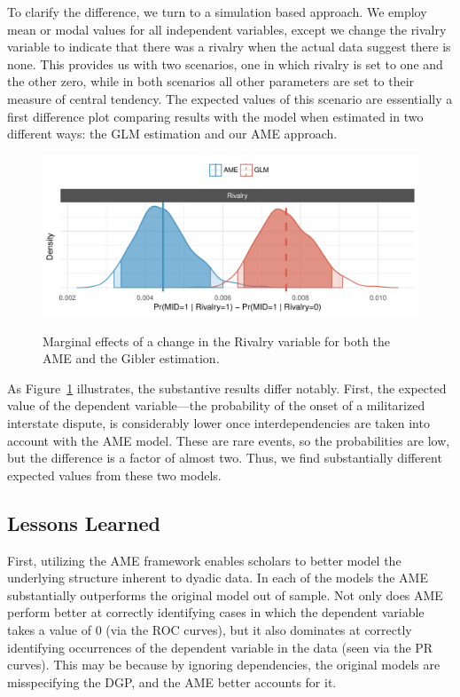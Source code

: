 To clarify the difference, we turn to a simulation based approach. We employ mean or modal values for all independent variables, except we change the rivalry variable to indicate that there was a rivalry when the actual data suggest there is none. This provides us with two scenarios, one in which rivalry is set to one and the other zero, while in both scenarios all other parameters are set to their measure of central tendency. The expected values of this scenario are essentially a first difference plot comparing results with the model when estimated in two different ways: the GLM estimation and our AME approach.

\begin{figure}
	\caption{Marginal effects of a change in the Rivalry variable for both the AME and the Gibler estimation.  \label{fig:gibmargeff}}
	\includegraphics[width=\textwidth]{graphics/gibler_margeff.pdf}
 	\label{fig:gibmargeff}
 \end{figure}

As Figure~\ref{fig:gibmargeff} illustrates, the substantive results differ notably. First, the expected value of the dependent variable---the probability of the onset of a militarized interstate dispute, is considerably lower once interdependencies are taken into account with the AME model.  These are rare events, so the probabilities are low, but the difference is a factor of almost two. Thus, we find substantially different expected values from these two models.

\subsection{Lessons Learned}

First, utilizing the AME framework enables scholars to better model the underlying structure inherent to dyadic data. In each of the models the AME substantially outperforms the original model out of sample. Not only does AME perform better at correctly identifying cases in which the dependent variable takes a value of $0$ (via the ROC curves), but it also dominates at correctly identifying occurrences of the dependent variable in the data (seen via the PR curves). This may be because by ignoring dependencies, the original models are misspecifying the DGP, and the AME better accounts for it.  

